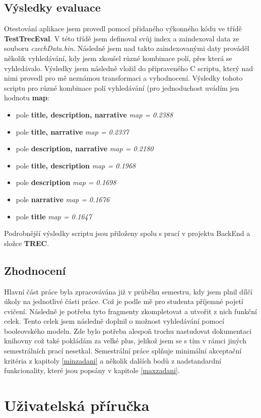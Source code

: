\documentclass[
12pt,
a4paper,
pdftex,
czech,
titlepage
]{report}
\begin{document}
\section{Výsledky evaluace}
Otestování aplikace jsem provedl pomocí přidaného výkonného kódu ve třídě \textbf{TestTrecEval}. V této třídě jsem definoval svůj index a zaindexoval data ze souboru \textit{czechData.bin}. Následně jsem nad takto zaindexovanými daty prováděl několik vyhledávání, kdy jsem zkoušel různé kombinace polí, přes která se vyhledávalo. Výsledky jsem následně vložil do připraveného C scriptu, který nad nimi provedl pro mě neznámou transformaci a vyhodnocení. Výsledky tohoto scriptu pro různé kombinace polí vyhledávání (pro jednoduchost uvádím jen hodnotu \textbf{map}:
\begin{itemize}
    \item pole \textbf{title, description, narrative} \textit{map = 0.2388}
    \item pole \textbf{title, narrative} \textit{map = 0.2337}
    \item pole \textbf{description, narrative} \textit{map = 0.2180}
    \item pole \textbf{title, description} \textit{map = 0.1968}
    \item pole \textbf{description} \textit{map = 0.1698}
    \item pole \textbf{narrative} \textit{map = 0.1676}
    \item pole \textbf{title} \textit{map = 0.1647}
\end{itemize}
Podrobnější výsledky scriptu jsou přiloženy spolu s prací v projektu BackEnd a složce \textbf{TREC}.
\section{Zhodnocení}
Hlavní část práce byla zpracovávána již v průběhu semestru, kdy jsem plnil dílčí úkoly na jednotlivé části práce. Což je podle mě pro studenta příjemné pojetí cvičení. Následně je potřeba tyto fragmenty zkompletovat a utvořit z nich funkční celek. Tento celek jsem následně doplnil o možnost vyhledávání pomocí booleovského modelu. Zde bylo potřeba alespoň trochu nastudovat dokumentaci knihovny což také pokládám za velké plus, jelikož jsem se s tím v rámci jiných semestrálních prací nesetkal.
Semestrální práce splňuje minimální akceptační kritéria z kapitoly \ref{minzadani} a několik dalších bodů z nadstandardní funkcionality, které jsou popsány v kapitole \ref{maxzadani}.
\chapter*{Uživatelská příručka}
\renewcommand{\thesection}{\Alph{section}}
\end{document}
